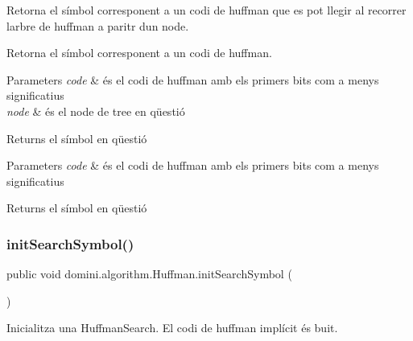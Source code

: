 Retorna el símbol corresponent a un codi de huffman que es pot llegir al recorrer l\textquotesingle{}arbre de huffman a paritr d\textquotesingle{}un node. 

Retorna el símbol corresponent a un codi de huffman.


\begin{DoxyParams}{Parameters}
{\em code} & és el codi de huffman amb els primers bits com a menys significatius \\
\hline
{\em node} & és el node de tree en qüestió \\
\hline
\end{DoxyParams}
\begin{DoxyReturn}{Returns}
el símbol en qüestió
\end{DoxyReturn}

\begin{DoxyParams}{Parameters}
{\em code} & és el codi de huffman amb els primers bits com a menys significatius \\
\hline
\end{DoxyParams}
\begin{DoxyReturn}{Returns}
el símbol en qüestió 
\end{DoxyReturn}
\mbox{\label{classdomini_1_1algorithm_1_1Huffman_aec935898b93387360acd588a05dc3f33}} 
\subsubsection{\texorpdfstring{init\+Search\+Symbol()}{initSearchSymbol()}}
{\footnotesize\ttfamily public void domini.\+algorithm.\+Huffman.\+init\+Search\+Symbol (\begin{DoxyParamCaption}{ }\end{DoxyParamCaption})\hspace{0.3cm}{\ttfamily [inline]}}



Inicialitza una Huffman\+Search. El codi de huffman implícit és buit. 

\mbox{\label{classdomini_1_1algorithm_1_1Huffman_a56a954cb68aad6701b609d0fc2c7c724}} 
